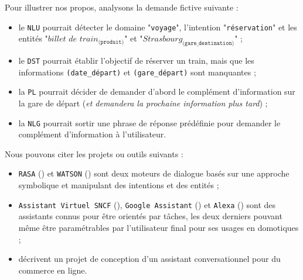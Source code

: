 			\begin{leftBarExamples}
				Pour illustrer nos propos, analysons la demande fictive suivante :
				\begin{quote}
					\begin{center}
					\end{center}
				\end{quote}
				\begin{itemize}
					\item le \texttt{NLU} pourrait détecter le domaine "\texttt{voyage}", l'intention "\texttt{réservation}" et les entités "$\textit{billet de train}_{\texttt{(produit)}}$" et "$\textit{Strasbourg}_{\texttt{(gare\_destination)}}$" ;
					\item le \texttt{DST} pourrait établir l'objectif de réserver un train, mais que les informations \texttt{(date\_départ)} et \texttt{(gare\_départ)} sont manquantes ;
					\item la \texttt{PL} pourrait décider de demander d'abord le complément d'information sur la gare de départ (\textit{et demandera la prochaine information plus tard}) ;
					\item la \texttt{NLG} pourrait sortir une phrase de réponse prédéfinie pour demander le complément d'information à l'utilisateur.
				\end{itemize}
			\end{leftBarExamples}
				
			\begin{leftBarExamples}
				Nous pouvons citer les projets ou outils suivants :
				\begin{itemize}
					\item \texttt{RASA} (\cite{bocklisch-etal:2017:rasa-open-source}) et \texttt{WATSON} (\cite{hoyt-etal:2016:ibm-watson-analytics}) sont deux moteurs de dialogue basés sur une approche symbolique et manipulant des intentions et des entités ;
					\item \texttt{Assistant Virtuel SNCF} (\cite{sncf:2018:agent-virtuel-sncf}), \texttt{Google Assistant} (\cite{google:2016:google-assistant-your}) et \texttt{Alexa} (\cite{alexa-internet:2018:keyword-research-competitor}) sont des assistants connus pour être orientés par tâches, les deux derniers pouvant même être paramétrables par l'utilisateur final pour ses usages en domotiques ;
					\item \cite{yan-etal:2017:building-taskoriented-dialogue} décrivent un projet de conception d'un assistant conversationnel pour du commerce en ligne.
				\end{itemize}
			\end{leftBarExamples}
		
